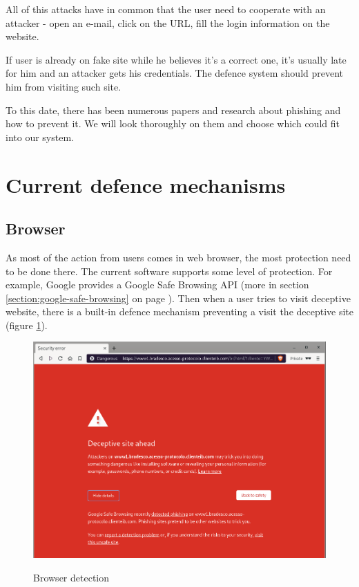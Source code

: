 \documentclass[
  digital, %
  oneside, %
  table,   %
  nolof,     %
  nolot,     %
]{fithesis3}
\begin{document}
All of this attacks have in common that the user need to  cooperate with an attacker - open an e-mail, click on the URL, fill the login information on the website.

If user is already on fake site while he believes it's a correct one, it's usually late for him and an attacker gets his credentials. The defence system should prevent him from visiting such site. 

To this date, there has been numerous papers and research about phishing and how to prevent it. We will look thoroughly on them and choose which could fit into our system.

\section{Current defence mechanisms}

\subsection{Browser}

As most of the action  from users comes in web browser, the most protection need to be done there. The current software supports some level of protection. For example, Google provides a Google Safe Browsing API (more in section \ref{section:google-safe-browsing} on page \pageref{section:google-safe-browsing}). Then when a user tries to visit deceptive website, there is a built-in defence mechanism preventing a visit the deceptive site (figure \ref{fig:browse-detection}).


\begin{figure}[h!]
  \caption{Browser detection}
  \centering
  \includegraphics[width=1\textwidth]{images/browser_phishing_detected.png}
  \label{fig:browse-detection}
\end{figure}
\end{document}
